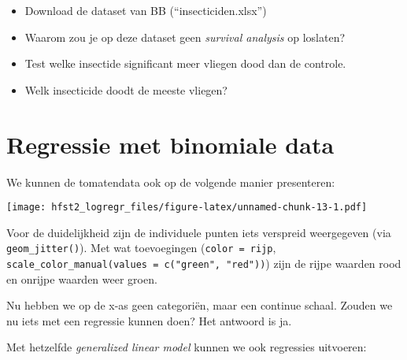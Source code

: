 \documentclass[]{book}
\newenvironment{Shaded}{\begin{snugshade}}{\end{snugshade}}
\newcommand{\KeywordTok}[1]{\textcolor[rgb]{0.13,0.29,0.53}{\textbf{{#1}}}}
\newcommand{\DataTypeTok}[1]{\textcolor[rgb]{0.13,0.29,0.53}{{#1}}}
\newcommand{\FloatTok}[1]{\textcolor[rgb]{0.00,0.00,0.81}{{#1}}}
\newcommand{\StringTok}[1]{\textcolor[rgb]{0.31,0.60,0.02}{{#1}}}
\newcommand{\NormalTok}[1]{{#1}}
\providecommand{\tightlist}{%
  \setlength{\itemsep}{0pt}\setlength{\parskip}{0pt}}
\theoremstyle{definition}
\theoremstyle{definition}
\theoremstyle{definition}
\theoremstyle{remark}
\begin{document}
\begin{itemize}
\tightlist
\item
  Download de dataset van BB (``insecticiden.xlsx'')
\item
  Waarom zou je op deze dataset geen \emph{survival analysis} op
  loslaten?
\item
  Test welke insectide significant meer vliegen dood dan de controle.
\item
  Welk insecticide doodt de meeste vliegen?
\end{itemize}

\section{Regressie met binomiale
data}\label{regressie-met-binomiale-data}

We kunnen de tomatendata ook op de volgende manier presenteren:

\begin{Shaded}
\end{Shaded}

\texttt{[image: hfst2\_logregr\_files/figure-latex/unnamed-chunk-13-1.pdf]}

Voor de duidelijkheid zijn de individuele punten iets verspreid
weergegeven (via \texttt{geom\_jitter()}). Met wat toevoegingen
(\texttt{color\ =\ rijp},
\texttt{scale\_color\_manual(values\ =\ c("green",\ "red"))}) zijn de
rijpe waarden rood en onrijpe waarden weer groen.

Nu hebben we op de x-as geen categoriën, maar een continue schaal.
Zouden we nu iets met een regressie kunnen doen? Het antwoord is ja.

Met hetzelfde \emph{generalized linear model} kunnen we ook regressies
uitvoeren:
\end{document}
